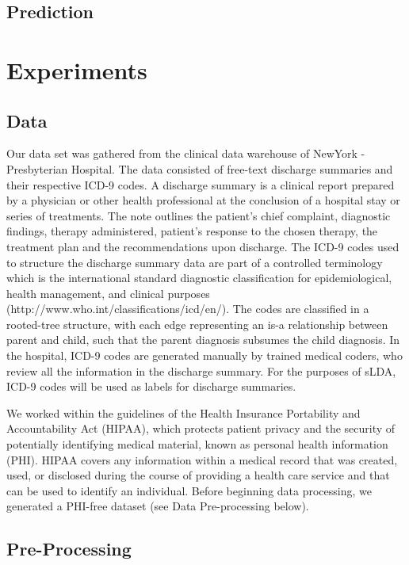 \documentclass{article}
\begin{document}
\subsection{Prediction}

\section{Experiments}
\label{sec:experiments}


\subsection{Data}

Our data set was gathered from the clinical data warehouse of NewYork
- Presbyterian Hospital. The data consisted of free-text discharge
summaries and their respective ICD-9 codes. A discharge summary is
a clinical report prepared by a physician or other health professional
at the conclusion of a hospital stay or series of treatments. The
note outlines the patient\textquoteright{}s chief complaint, diagnostic
findings, therapy administered, patient\textquoteright{}s response
to the chosen therapy, the treatment plan and the recommendations
upon discharge. The ICD-9 codes used to structure the discharge summary
data are part of a controlled terminology which is the international
standard diagnostic classification for epidemiological, health management,
and clinical purposes (http://www.who.int/classifications/icd/en/).
The codes are classified in a rooted-tree structure, with each edge
representing an is-a relationship between parent and child, such that
the parent diagnosis subsumes the child diagnosis. In the hospital,
ICD-9 codes are generated manually by trained medical coders, who
review all the information in the discharge summary. For the purposes
of sLDA, ICD-9 codes will be used as labels for discharge summaries.

We worked within the guidelines of the Health Insurance Portability
and Accountability Act (HIPAA), which protects patient privacy and
the security of potentially identifying medical material, known as
personal health information (PHI). HIPAA covers any information within
a medical record that was created, used, or disclosed during the course
of providing a health care service and that can be used to identify
an individual. Before beginning data processing, we generated a PHI-free
dataset (see Data Pre-processing below).


\subsection{Pre-Processing}
\end{document}
